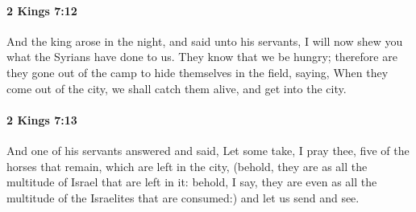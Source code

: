 		\paragraph{2 Kings 7:12} %
			\label{2KINGS-7-12}

			And the king arose in the night, and said unto his servants, I will now shew you what the Syrians have done to us. They know that we be hungry; therefore are they gone out of the camp to hide themselves in the field, saying, When they come out of the city, we shall catch them alive, and get into the city.


		\paragraph{2 Kings 7:13} %
			\label{2KINGS-7-13}

			And one of his servants answered and said, Let some take, I pray thee, five of the horses that remain, which are left in the city, (behold, they are as all the multitude of Israel that are left in it: behold, I say, they are even as all the multitude of the Israelites that are consumed:) and let us send and see.

